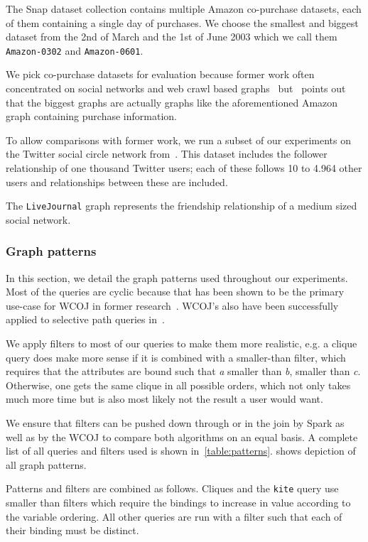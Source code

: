 The Snap dataset collection contains multiple Amazon co-purchase datasets, each of them containing a single day of purchases.
We choose the smallest and biggest dataset from the 2nd of March and the 1st of June 2003 which we call them \texttt{Amazon-0302} and
\texttt{Amazon-0601}.

We pick co-purchase datasets for evaluation because former work often concentrated on social networks and web crawl based
graphs~\cite{myria-detailed,ammar2018distributed} but~\cite{salihoglu2018} points out that the biggest graphs are actually graphs like
the aforementioned Amazon graph containing purchase information.

To allow comparisons with former work, we run a subset of our experiments on the Twitter social circle network from~\cite{snapnets}.
This dataset includes the follower relationship of one thousand Twitter users; each of these follows 10 to 4.964 other users and
relationships between these are included.

The \texttt{LiveJournal} graph represents the friendship relationship of a medium sized social network.

\subsubsection{Graph patterns}

In this section, we detail the graph patterns used throughout our experiments.
Most of the queries are cyclic because that has been shown to be the primary use-case for WCOJ in former research~\cite{olddog,myria-detailed}.
WCOJ's also have been successfully applied to selective path queries in~\cite{olddog,longbin}.

We apply filters to most of our queries to make them more realistic, e.g. a clique query does make more sense if it is combined with a
smaller-than filter, which requires that the attributes are bound such that \textit{a} smaller than \textit{b}, smaller than \textit{c}.
Otherwise, one gets the same clique in all possible orders, which not only takes much more time but is also most
likely not the result a user would want.

We ensure that filters can be pushed down through or in the join by Spark as well as by the WCOJ to compare both algorithms on an equal basis.
A complete list of all queries and filters used is shown in~\cref{table:patterns}.
 shows depiction of all graph patterns.

Patterns and filters are combined as follows.
Cliques and the \texttt{kite} query use smaller than filters which require the bindings to increase
in value according to the variable ordering.
All other queries are run with a filter such that each of their binding must be distinct.


